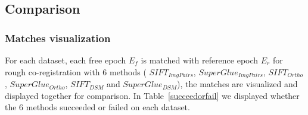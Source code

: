 \subsection{Comparison}

\subsubsection{Matches visualization}
For each dataset, each free epoch $E_f$ is matched with reference epoch $E_r$ for rough co-registration with 6 methods ( $SIFT_{ImgPairs}$,  $SuperGlue_{ImgPairs}$,  $SIFT_{Ortho}$,  $SuperGlue_{Ortho}$,  $SIFT_{DSM}$ and  $SuperGlue_{DSM}$), the matches are visualized and displayed together for comparison. In Table~\ref{succeedorfail} we displayed whether the 6 methods succeeded or failed on each dataset.\\
